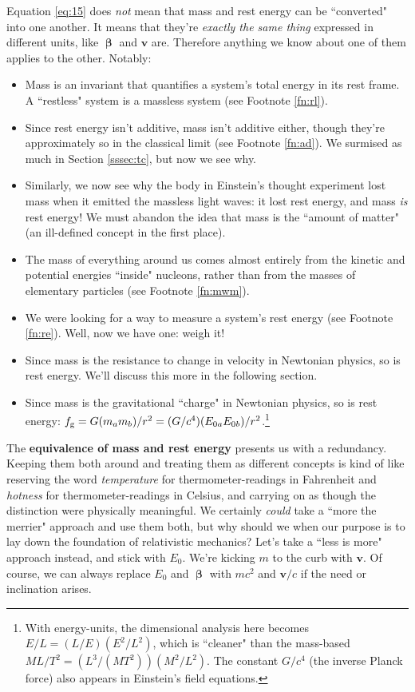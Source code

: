 \documentclass[12pt]{article}
\renewcommand{\vv}[1]{\mathbf{#1}}
\newcommand{\vvbeta}{\bm{\upbeta}}
\begin{document}
Equation \ref{eq:15} does \emph{not} mean that mass and rest energy can be ``converted" into one another. It means that they're \emph{exactly the same thing} expressed in different units, like $\vvbeta$ and $\vv v$ are. Therefore anything we know about one of them applies to the other. Notably:
\begin{itemize}
\item Mass is an invariant that quantifies a system's total energy in its rest frame. A ``restless" system is a massless system (see Footnote \ref{fn:rl}).
\item Since rest energy isn't additive, mass isn't additive either, though they're approximately so in the classical limit (see Footnote \ref{fn:ad}). We surmised as much in Section \ref{sssec:tc}, but now we see why.
\item Similarly, we now see why the body in Einstein's thought experiment lost mass when it emitted the massless light waves: it lost rest energy, and mass \emph{is} rest energy! We must abandon the idea that mass is the ``amount of matter" (an ill-defined concept in the first place).
\item The mass of everything around us comes almost entirely from the kinetic and potential energies ``inside" nucleons, rather than from the masses of elementary particles (see Footnote \ref{fn:mwm}).
\item We were looking for a way to measure a system's rest energy (see Footnote \ref{fn:re}). Well, now we have one: weigh it!
\item Since mass is the resistance to change in velocity in Newtonian physics, so is rest energy. We'll discuss this more in the following section.
\item Since mass is the gravitational ``charge" in Newtonian physics, so is rest energy: $f_{\mathrm{g}} = G(m_a m_b)/r^2 = (G/c^4)(E_{0 \mkern.5mu a} E_{0 \mkern.5mu b})/r^2$.\footnote{With energy-units, the dimensional analysis here becomes ${E/L = (L/E) (E^2 / L^{2})}$, which is ``cleaner" than the mass-based ${ML/T^{2} = (L^{3}/(MT^{2})) (M^2/L^{2})}$. The constant $G / c^4$ (the inverse Planck force) also appears in Einstein's field equations.}
\end{itemize}

The \textbf{equivalence of mass and rest energy} presents us with a redundancy. Keeping them both around and treating them as different concepts is kind of like reserving the word \emph{temperature} for thermometer-readings in Fahrenheit and \emph{hotness} for thermometer-readings in Celsius, and carrying on as though the distinction were physically meaningful. We certainly \emph{could} take a ``more the merrier" approach and use them both, but why should we when our purpose is to lay down the foundation of relativistic mechanics? Let's take a ``less is more" approach instead, and stick with $E_0$. We're kicking $m$ to the curb with $\vv v$. Of course, we can always replace $E_0$ and $\vvbeta$ with $mc^2$ and $\vv v/c$ if the need or inclination arises.
\end{document}
